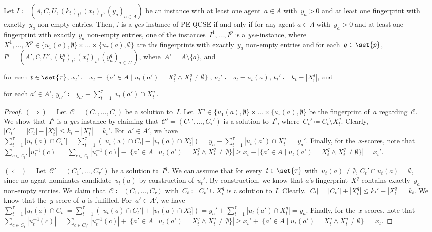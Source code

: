 \documentclass[10pt,a4paper,twocolumn]{article}
\theoremstyle{plain}
\theoremstyle{definition}
\theoremstyle{remark}
\newcommand{\prob}[1]{\textnormal{\textsc{#1}}}
\newcommand{\RD}{$(\Rightarrow)\quad$}
\newcommand{\LD}{$(\Leftarrow)\quad$}
\newcommand{\calC}{\mathcal{C}}
\newcommand{\yes}{\emph{yes}}
\newcommand{\ceq}{\coloneqq}
\newcommand{\fmlaAcr}{\prob{QCSE}}
\newcommand{\pefmlaAcr}{\prob{PE-\fmlaAcr}}
\begin{document}
{{  \begin{lemma}
  \label{lemma:turred:fmla}
  Let $I\ceq (A,C,U,(k_t)_t,(x_t)_t,(y_a)_{a\in A})$ be an instance with
  at least one agent~$a\in A$ with~$y_a>0$ and 
  at least one fingerprint with exactly~$y_a$ non-empty entries.
  Then,
  $I$ is a \yes-instance of \pefmlaAcr{}
  if and only if 
  for any agent $a\in A$ with~$y_a>0$ and 
  at least one fingerprint with exactly~$y_a$ non-empty entries,
  one of the instances~$I^1,\dots,I^p$
  is a \yes-instance,
  where~$X^1,\dots,X^p\in \{u_1(a),\emptyset\}\times\dots\times\{u_\tau(a),\emptyset\}$ are the fingerprints with exactly~$y_a$ non-empty entries 
  and for each~$q\in\set{p}$,
  $I^q=(A',C,U',(k_t^q)_t,(x_t^q)_t,(y_a^q)_{a\in A'})$,
  where~$A'=A\setminus \{a\}$, 
  and 
  \begin{compactitem}
    \item for each $t\in\set{\tau}$, 
      $x_t'\ceq x_t-|\{a'\in A\mid u_t(a')=X_t^q\land X_t^q\neq \emptyset\}|$,
      $u_t'\ceq u_t-u_t(a)$, 
      $k_t'\ceq k_t-|X_t^q|$, 
      and 
    \item for each $a'\in A'$,
      $y_{a'}'\ceq y_{a'}-\sum_{t=1}^\tau |u_t(a')\cap X_t^q|$.
  \end{compactitem}
  \end{lemma}

  \begin{proof}
  \RD{}
  Let~$\calC=(C_1,\dots,C_\tau)$ be a solution to~$I$.
  Let~$X^q\in \{u_1(a),\emptyset\}\times\dots\times\{u_\tau(a),\emptyset\}$ be the fingerprint
  of~$a$ regarding~$\calC$.
  We show that~$I^q$ is a \yes-instance
  by claiming that~$\calC'=(C_1',\dots,C_\tau')$ is a solution to~$I^q$,
  where~$C_t'\ceq C_t\setminus X_t^q$.
  Clearly,
  $|C_t'|=|C_t|-|X_t^q|\leq k_t-|X_t^q|=k_t'$.
  For~$a'\in A'$,
  we have~$\sum_{t=1}^\tau |u_t(a)\cap C_t'| = \sum_{t=1}^\tau (|u_t(a)\cap C_t| - |u_t(a)\cap X_t^q|) = y_a- \sum_{t=1}^\tau |u_t(a')\cap X_t^q| =y_a'$.
  Finally,
  for the~$x$-scores,
  note that
  $\sum_{c\in C_t'} |u^{-1}_t(c)| 
  = \sum_{c\in C_t} |u^{-1}_t(c)| - |\{a'\in A\mid u_t(a')=X_t^q\land X_t^q\neq \emptyset\}|
  \geq x_t- |\{a'\in A\mid u_t(a')=X_t^q\land X_t^q\neq \emptyset\}|
  = x_t'$.
  
  \LD{}
  Let~$\calC'=(C_1',\dots,C_\tau')$ be a solution to~$I^q$.
  We can assume that for every~$t\in\set{\tau}$ with~$u_t(a)\neq \emptyset$,
  $C_t'\cap u_t(a)=\emptyset$,
  since no agent nominates candidate~$u_t(a)$ by construction of~$u_t'$.
  By construction,
  we know that $a$'s fingerprint~$X^q$ contains exactly~$y_a$ non-empty entries.
  We claim that~$\calC\ceq (C_1,\dots,C_\tau)$ with~$C_t\ceq C_t'\cup X_t^q$
  is a solution to~$I$.
  Clearly,
  $|C_t|=|C_t'|+|X_t^q|\leq k_t'+|X_t^q|=k_t$.
  We know that the~$y$-score of~$a$ is fulfilled.
  For~$a'\in A'$,
  we have~$\sum_{t=1}^\tau |u_t(a)\cap C_t| = \sum_{t=1}^\tau (|u_t(a)\cap C_t'| + |u_t(a)\cap X_t^q|) = y_a'+ \sum_{t=1}^\tau |u_t(a')\cap X_t^q| =y_a$.
  Finally,
  for the~$x$-scores,
  note that
  $\sum_{c\in C_t} |u^{-1}_t(c)| 
  = \sum_{c\in C_t'} |u^{-1}_t(c)| + |\{a'\in A\mid u_t(a')=X_t^q\land X_t^q\neq \emptyset\}|
  \geq x_t'+ |\{a'\in A\mid u_t(a')=X_t^q\land X_t^q\neq \emptyset\}|
  = x_t$.
  \end{proof}

}}
\end{document}
